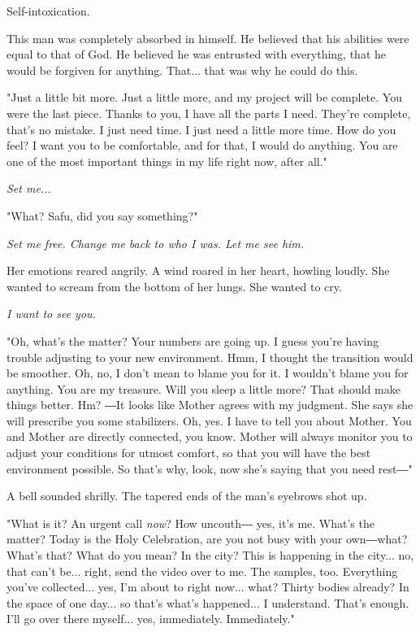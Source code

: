 Self-intoxication.

This man was completely absorbed in himself. He believed that his
abilities were equal to that of God. He believed he was entrusted with
everything, that he would be forgiven for anything. That... that was why
he could do this.

"Just a little bit more. Just a little more, and my project will be
complete. You were the last piece. Thanks to you, I have all the parts I
need. They're complete, that's no mistake. I just need time. I just need
a little more time. How do you feel? I want you to be comfortable, and
for that, I would do anything. You are one of the most important things
in my life right now, after all."

\emph{Set me...}

"What? Safu, did you say something?"

\emph{Set me free. Change me back to who I was. Let me see him.}

Her emotions reared angrily. A wind roared in her heart, howling loudly.
She wanted to scream from the bottom of her lungs. She wanted to cry.

\emph{I want to see you.}

"Oh, what's the matter? Your numbers are going up. I guess you're having
trouble adjusting to your new environment. Hmm, I thought the transition
would be smoother. Oh, no, I don't mean to blame you for it. I wouldn't
blame you for anything. You are my treasure. Will you sleep a little
more? That should make things better. Hm? ―It looks like Mother agrees
with my judgment. She says she will prescribe you some stabilizers. Oh,
yes. I have to tell you about Mother. You and Mother are directly
connected, you know. Mother will always monitor you to adjust your
conditions for utmost comfort, so that you will have the best
environment possible. So that's why, look, now she's saying that you
need rest―"

A bell sounded shrilly. The tapered ends of the man's eyebrows shot up.

"What is it? An urgent call \emph{now}? How uncouth― yes, it's me. What's the
matter? Today is the Holy Celebration, are you not busy with your
own―what? What's that? What do you mean? In the city? This is happening
in the city... no, that can't be... right, send the video over to me.
The samples, too. Everything you've collected... yes, I'm about to right
now... what? Thirty bodies already? In the space of one day... so that's
what's happened... I understand. That's enough. I'll go over there
myself... yes, immediately. Immediately."

